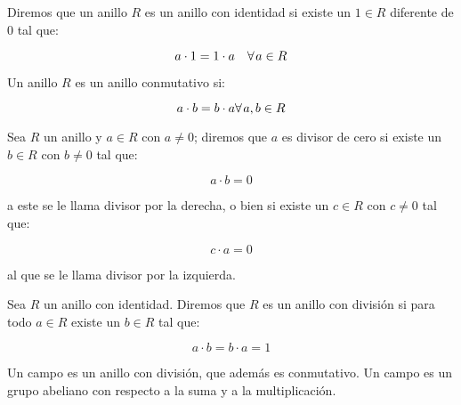         \begin{definicion}
            Diremos que un anillo $R$ es un anillo con identidad si existe un $1 \in R$ diferente de $0$ tal que:

            \begin{equation}
                a \cdot 1 = 1 \cdot a \quad \forall \mkern2mu a \in R
            \end{equation}
        \end{definicion}

        \begin{definicion}
            Un anillo $R$ es un anillo conmutativo si:

            \begin{equation}
                a \cdot b = b \cdot a \forall \mkern2mu a, b \in R
            \end{equation}
        \end{definicion}

        \begin{definicion}
            Sea $R$ un anillo y $a \in R$ con $a \ne 0$; diremos que $a$ es divisor de cero si existe un $b \in R$ con $b \ne 0$ tal que:

            \begin{equation}
                a \cdot b = 0
            \end{equation}

            a este se le llama divisor por la derecha, o bien si existe un $c \in R$ con $c \ne 0$ tal que:

            \begin{equation}
                c \cdot a = 0
            \end{equation}

            al que se le llama divisor por la izquierda.
        \end{definicion}

        \begin{definicion}
            Sea $R$ un anillo con identidad. Diremos que $R$ es un anillo con división si para todo $a \in R$ existe un $b \in R$ tal que:

            \begin{equation}
                a \cdot b = b \cdot a = 1
            \end{equation}
        \end{definicion}

        \begin{definicion}
            Un campo es un anillo con división, que además es conmutativo.
            Un campo es un grupo abeliano con respecto a la suma y a la multiplicación.
        \end{definicion}


